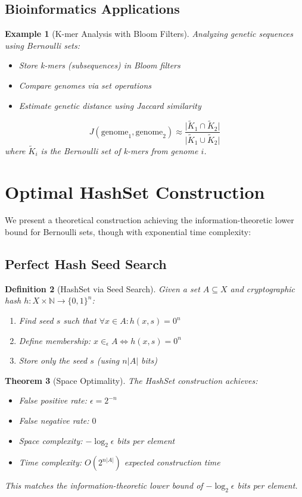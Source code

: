 \documentclass[11pt,final,hidelinks]{article}
\newtheorem{theorem}{Theorem}[section]
\newtheorem{definition}[theorem]{Definition}
\newtheorem{example}[theorem]{Example}
\newcommand{\obs}[1]{\widetilde{#1}}  %
\newcommand{\Card}[1]{\lvert#1\rvert}
\newcommand{\ASet}[1]{\obs{#1}}  %
\begin{document}
\subsection{Bioinformatics Applications}

\begin{example}[K-mer Analysis with Bloom Filters]
Analyzing genetic sequences using Bernoulli sets:
\begin{itemize}
    \item Store k-mers (subsequences) in Bloom filters
    \item Compare genomes via set operations
    \item Estimate genetic distance using Jaccard similarity
\end{itemize}

\begin{equation}
J(\text{genome}_1, \text{genome}_2) \approx \frac{\Card{\ASet{K}_1 \cap \ASet{K}_2}}{\Card{\ASet{K}_1 \cup \ASet{K}_2}}
\end{equation}
where $\ASet{K}_i$ is the Bernoulli set of k-mers from genome $i$.
\end{example}

\section{Optimal HashSet Construction}

We present a theoretical construction achieving the information-theoretic lower bound for Bernoulli sets, though with exponential time complexity:

\subsection{Perfect Hash Seed Search}

\begin{definition}[HashSet via Seed Search]
Given a set $A \subseteq X$ and cryptographic hash $h : X \times \mathbb{N} \to \{0,1\}^n$:
\begin{enumerate}
    \item Find seed $s$ such that $\forall x \in A: h(x, s) = 0^n$
    \item Define membership: $x \in_\epsilon A \iff h(x, s) = 0^n$
    \item Store only the seed $s$ (using $n|A|$ bits)
\end{enumerate}
\end{definition}

\begin{theorem}[Space Optimality]
The HashSet construction achieves:
\begin{itemize}
    \item False positive rate: $\epsilon = 2^{-n}$
    \item False negative rate: $0$
    \item Space complexity: $-\log_2 \epsilon$ bits per element
    \item Time complexity: $O(2^{n|A|})$ expected construction time
\end{itemize}
This matches the information-theoretic lower bound of $-\log_2 \epsilon$ bits per element.
\end{theorem}
\end{document}
